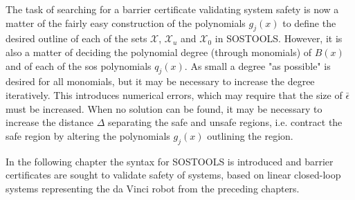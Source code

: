 The task of searching for a barrier certificate validating system safety is now a matter of the fairly easy construction of the polynomials $g_j(x)$ to define the desired outline of each of the sets $\mathcal{X}$, $\mathcal{X}_u$ and $\mathcal{X}_0$ in SOSTOOLS. However, it is also a matter of deciding the polynomial degree (through monomials) of $B(x)$ and of each of the \gls{sos} polynomials $q_j(x)$. As small a degree "as possible" is desired for all monomials, but it may be necessary to increase the degree iteratively. This introduces numerical errors, which may require that the size of $\bar{\epsilon}$ must be increased. When no solution can be found, it may be necessary to increase the  distance $\Delta$ separating the safe and unsafe regions, i.e. contract the safe region by altering the polynomials $g_j(x)$ outlining the region.


In the following chapter the syntax for SOSTOOLS is introduced and barrier certificates are sought to validate safety of systems, based on linear closed-loop systems representing the da Vinci robot from the preceding chapters.

 
	


%

